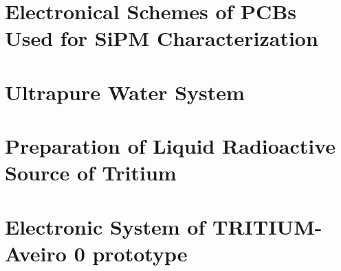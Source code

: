 \documentclass[12pt,a4paper]{book}
\begin{document}
\chapter{Electronical Schemes of PCBs Used for SiPM Characterization}\label{App:ElectronicalSchemesSiPMPCBs}


\chapter{Ultrapure Water System}\label{App:UltraPureWaterSystem}


\chapter{Preparation of Liquid Radioactive Source of Tritium}\label{App:TritiumSourcePreparation}


\chapter{Electronic System of TRITIUM-Aveiro 0 prototype}\label{App:ElectronicSystemAveiro}


%

%




\end{document}
